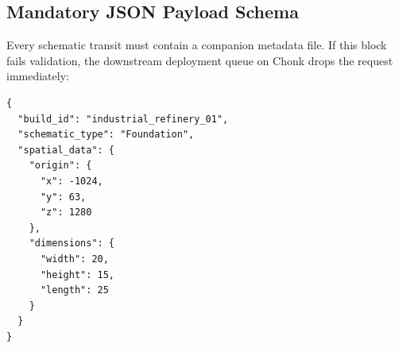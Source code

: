 \subsection{Mandatory JSON Payload Schema}
Every schematic transit must contain a companion metadata file. If this block fails validation, the downstream deployment queue on Chonk drops the request immediately:

\begin{lstlisting}[style=bashstyle, caption={Mandatory Schematic Meta Payload}]
{
  "build_id": "industrial_refinery_01",
  "schematic_type": "Foundation",
  "spatial_data": {
    "origin": {
      "x": -1024,
      "y": 63,
      "z": 1280
    },
    "dimensions": {
      "width": 20,
      "height": 15,
      "length": 25
    }
  }
}
\end{lstlisting}